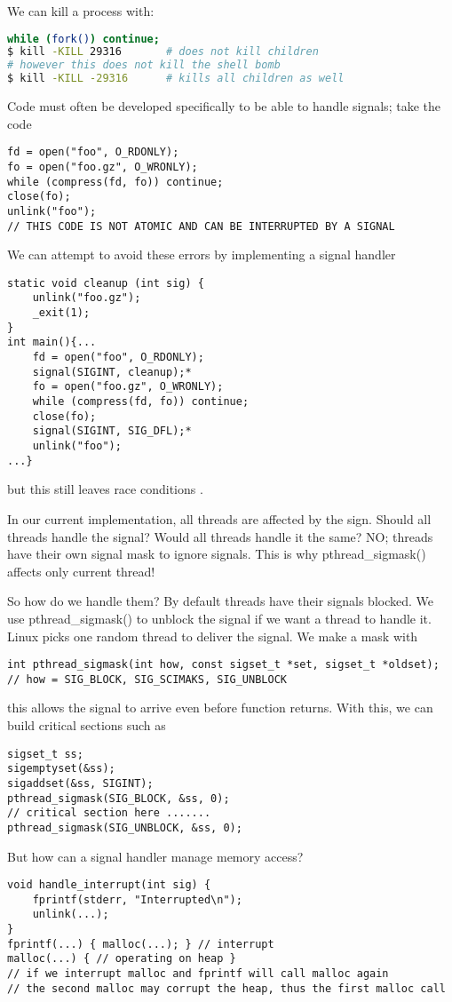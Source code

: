 \documentclass[../../lecture_notes.tex]{subfiles}
\begin{document}
We can kill a process with:
\begin{lstlisting}[language=sh]
while (fork()) continue;
$ kill -KILL 29316       # does not kill children
# however this does not kill the shell bomb
$ kill -KILL -29316      # kills all children as well  
\end{lstlisting}


Code must often be developed specifically to be able to handle signals; take the code
\begin{lstlisting}
fd = open("foo", O_RDONLY);
fo = open("foo.gz", O_WRONLY);
while (compress(fd, fo)) continue;
close(fo);
unlink("foo");
// THIS CODE IS NOT ATOMIC AND CAN BE INTERRUPTED BY A SIGNAL
\end{lstlisting}


We can attempt to avoid these errors by implementing a signal handler
\begin{lstlisting}
static void cleanup (int sig) {
	unlink("foo.gz");    
	_exit(1);            
}
int main(){... 
	fd = open("foo", O_RDONLY);
	signal(SIGINT, cleanup);*
	fo = open("foo.gz", O_WRONLY);
	while (compress(fd, fo)) continue;
	close(fo);
	signal(SIGINT, SIG_DFL);*
	unlink("foo");
...}
\end{lstlisting}
but this still leaves race conditions .


In our current implementation, all threads are affected by the sign. Should all threads handle the signal? Would all threads handle it the same? NO; threads have their own signal mask to ignore signals. This is why pthread\_sigmask() affects only current thread!


So how do we handle them? By default threads have their signals blocked. We use pthread\_sigmask() to unblock the signal if we want a thread to handle it. Linux picks one random thread to deliver the signal. We make a mask with
\begin{lstlisting}
int pthread_sigmask(int how, const sigset_t *set, sigset_t *oldset);
// how = SIG_BLOCK, SIG_SCIMAKS, SIG_UNBLOCK
\end{lstlisting}
this allows the signal to arrive even before function returns. With this, we can build critical sections such as
\begin{lstlisting}
sigset_t ss;
sigemptyset(&ss);
sigaddset(&ss, SIGINT);
pthread_sigmask(SIG_BLOCK, &ss, 0);
// critical section here .......
pthread_sigmask(SIG_UNBLOCK, &ss, 0);
\end{lstlisting}

But how can a signal handler manage memory access?
\begin{lstlisting}
void handle_interrupt(int sig) {
	fprintf(stderr, "Interrupted\n");
	unlink(...);
}
fprintf(...) { malloc(...); } // interrupt
malloc(...) { // operating on heap }
// if we interrupt malloc and fprintf will call malloc again
// the second malloc may corrupt the heap, thus the first malloc call
\end{lstlisting}
\end{document}
